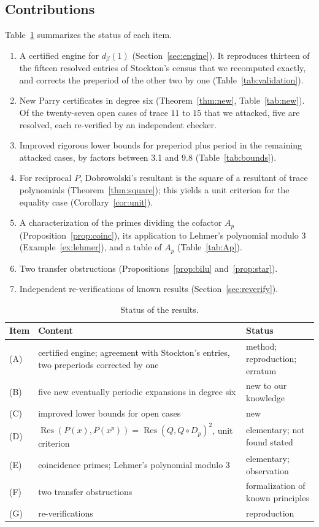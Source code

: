 \documentclass[11pt]{amsart}
\theoremstyle{definition}
\theoremstyle{remark}
\DeclareMathOperator{\Res}{Res}
\begin{document}
\subsection*{Contributions}
Table~\ref{tab:status} summarizes the status of each item.
\begin{enumerate}
\item[(A)] A certified engine for $d_\beta(1)$ (Section~\ref{sec:engine}). It reproduces thirteen of the fifteen resolved entries of Stockton's census that we recomputed exactly, and corrects the preperiod of the other two by one (Table~\ref{tab:validation}).
\item[(B)] New Parry certificates in degree six (Theorem~\ref{thm:new}, Table~\ref{tab:new}). Of the twenty-seven open cases of trace $11$ to $15$ that we attacked, five are resolved, each re-verified by an independent checker.
\item[(C)] Improved rigorous lower bounds for preperiod plus period in the remaining attacked cases, by factors between 3.1 and 9.8 (Table~\ref{tab:bounds}).
\item[(D)] For reciprocal $P$, Dobrowolski's resultant is the square of a resultant of trace polynomials (Theorem~\ref{thm:square}); this yields a unit criterion for the equality case (Corollary~\ref{cor:unit}).
\item[(E)] A characterization of the primes dividing the cofactor $A_p$ (Proposition~\ref{prop:coinc}), its application to Lehmer's polynomial modulo $3$ (Example~\ref{ex:lehmer}), and a table of $A_p$ (Table~\ref{tab:Ap}).
\item[(F)] Two transfer obstructions (Propositions~\ref{prop:bilu} and~\ref{prop:star}).
\item[(G)] Independent re-verifications of known results (Section~\ref{sec:reverify}).
\end{enumerate}

\begin{table}[ht]
\centering\small
\caption{Status of the results.}\label{tab:status}
\begin{tabular}{@{}p{}p{}p{}@{}}
\toprule
Item & Content & Status\\
\midrule
(A) & certified engine; agreement with Stockton's entries, two preperiods corrected by one & method; reproduction; erratum\\
(B) & five new eventually periodic expansions in degree six & new to our knowledge\\
(C) & improved lower bounds for open cases & new\\
(D) & $\Res(P(x),P(x^p))=\Res(Q,Q\circ D_p)^2$, unit criterion & elementary; not found stated\\
(E) & coincidence primes; Lehmer's polynomial modulo $3$ & elementary; observation\\
(F) & two transfer obstructions & formalization of known principles\\
(G) & re-verifications & reproduction\\
\bottomrule
\end{tabular}
\end{table}
\end{document}
